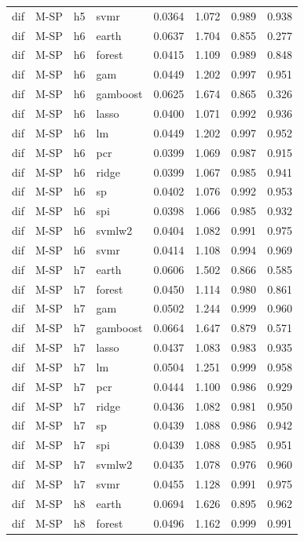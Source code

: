 \begin{ThreePartTable}
\begin{longtable}[t]{llclcccc}
dif & M-SP & h5 & svmr & 0.0364 & 1.072 & 0.989 & 0.938\\
\addlinespace
dif & M-SP & h6 & earth & 0.0637 & 1.704 & 0.855 & 0.277\\
dif & M-SP & h6 & forest & 0.0415 & 1.109 & 0.989 & 0.848\\
dif & M-SP & h6 & gam & 0.0449 & 1.202 & 0.997 & 0.951\\
dif & M-SP & h6 & gamboost & 0.0625 & 1.674 & 0.865 & 0.326\\
dif & M-SP & h6 & lasso & 0.0400 & 1.071 & 0.992 & 0.936\\
dif & M-SP & h6 & lm & 0.0449 & 1.202 & 0.997 & 0.952\\
dif & M-SP & h6 & pcr & 0.0399 & 1.069 & 0.987 & 0.915\\
dif & M-SP & h6 & ridge & 0.0399 & 1.067 & 0.985 & 0.941\\
dif & M-SP & h6 & sp & 0.0402 & 1.076 & 0.992 & 0.953\\
dif & M-SP & h6 & spi & 0.0398 & 1.066 & 0.985 & 0.932\\
dif & M-SP & h6 & svmlw2 & 0.0404 & 1.082 & 0.991 & 0.975\\
dif & M-SP & h6 & svmr & 0.0414 & 1.108 & 0.994 & 0.969\\
\addlinespace
dif & M-SP & h7 & earth & 0.0606 & 1.502 & 0.866 & 0.585\\
dif & M-SP & h7 & forest & 0.0450 & 1.114 & 0.980 & 0.861\\
dif & M-SP & h7 & gam & 0.0502 & 1.244 & 0.999 & 0.960\\
dif & M-SP & h7 & gamboost & 0.0664 & 1.647 & 0.879 & 0.571\\
dif & M-SP & h7 & lasso & 0.0437 & 1.083 & 0.983 & 0.935\\
dif & M-SP & h7 & lm & 0.0504 & 1.251 & 0.999 & 0.958\\
dif & M-SP & h7 & pcr & 0.0444 & 1.100 & 0.986 & 0.929\\
dif & M-SP & h7 & ridge & 0.0436 & 1.082 & 0.981 & 0.950\\
dif & M-SP & h7 & sp & 0.0439 & 1.088 & 0.986 & 0.942\\
dif & M-SP & h7 & spi & 0.0439 & 1.088 & 0.985 & 0.951\\
dif & M-SP & h7 & svmlw2 & 0.0435 & 1.078 & 0.976 & 0.960\\
dif & M-SP & h7 & svmr & 0.0455 & 1.128 & 0.991 & 0.975\\
\addlinespace
dif & M-SP & h8 & earth & 0.0694 & 1.626 & 0.895 & 0.962\\
dif & M-SP & h8 & forest & 0.0496 & 1.162 & 0.999 & 0.991\\

\end{longtable}
\end{ThreePartTable}
